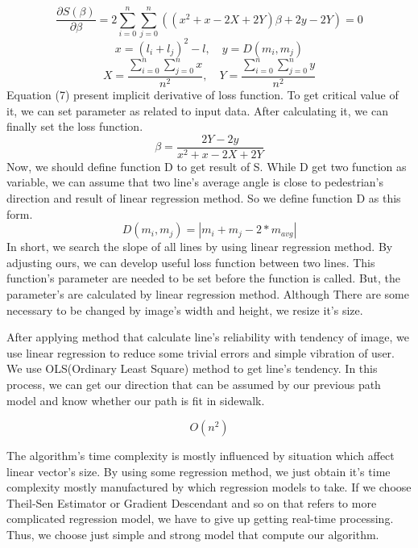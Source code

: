\begin{equation}
\mathit{\frac{\partial S(\beta)}{\partial \beta} =2 \sum_{i=0}^{n}{\sum_{j=0}^{n}{((x^{2}+x-2X+2Y)\beta + 2y-2Y)}}=0} 
\end{equation}
\begin{equation}
\mathit{x = (l_{i}+l_{j})^2 - l,\quad y = D(m_{i},m_{j})}
\end{equation}
\begin{equation}
\mathit{X=\frac{\sum_{i=0}^{n}{\sum_{j=0}^{n}}{x}}{n^{2}},\quad Y=\frac{\sum_{i=0}^{n}{\sum_{j=0}^{n}{y}}}{n^{2}}}
\end{equation}
Equation (7) present implicit derivative of loss function. To get critical value of it, we can set parameter as related to input data. After calculating it, we can finally set the loss function. 
\begin{equation}
\mathit{\beta = \frac{2Y-2y}{x^2+x-2X+2Y}}
\end{equation}
Now, we should define function D to get result of S. While D get two function as variable, we can assume that two line's average angle is close to pedestrian's direction and result of linear regression method. So we define function D as this form.
\begin{equation}
\mathit{D(m_{i},m_{j}) = |m_i + m_j - 2 *m_{avg}|}
\end{equation} 
In short, we search the slope of all lines by using linear regression method. By adjusting ours, we can develop useful loss function between two lines. This function's parameter are needed to be set before the function is called. But, the parameter's are calculated by linear regression method. Although There are some necessary to be changed by image's width and height, we resize it's size.\quad
 
After applying method that calculate line's reliability with tendency of image, we use linear regression to reduce some trivial errors and simple vibration of user. We use OLS(Ordinary Least Square) method to get line's tendency. In this process, we can get our direction that can be assumed by our previous path model and know whether our path is fit in sidewalk. 

\begin{equation}
\mathit{O(n^2)}
\end{equation}

The algorithm's time complexity is mostly influenced by situation which affect linear vector's size. By using some regression method, we just obtain it's time complexity mostly manufactured by which regression models to take. If we choose Theil-Sen Estimator or Gradient Descendant and so on that refers to more complicated regression model, we have to give up getting real-time processing. Thus, we choose just simple and strong model that compute our algorithm.